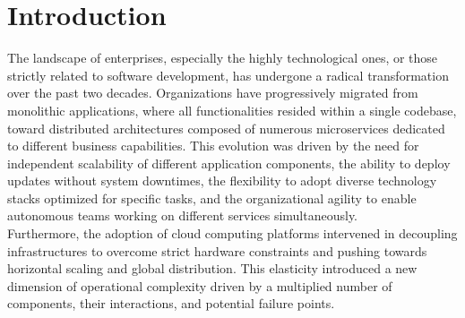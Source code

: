 \documentclass[12pt,a4paper,openright,twoside]{book}
\begin{document}
\tableofcontents   
\listoffigures     %
\lstlistoflistings %

\mainmatter

\chapter{Introduction}
\label{chap:introduction}

The landscape of enterprises, especially the highly technological ones, or those strictly related to software development, has undergone a radical transformation over the past two decades. Organizations have progressively migrated from monolithic applications, where all functionalities resided within a single codebase, toward distributed architectures composed of numerous microservices dedicated to different business capabilities. This evolution was driven by the need for independent scalability of different application components, the ability to deploy updates without system downtimes, the flexibility to adopt diverse technology stacks optimized for specific tasks, and the organizational agility to enable autonomous teams working on different services simultaneously. \\ Furthermore, the adoption of cloud computing platforms intervened in decoupling infrastructures to overcome strict hardware constraints and pushing towards horizontal scaling and global distribution. This elasticity introduced a new dimension of operational complexity driven by a multiplied number of components, their interactions, and potential failure points. 
\end{document}
